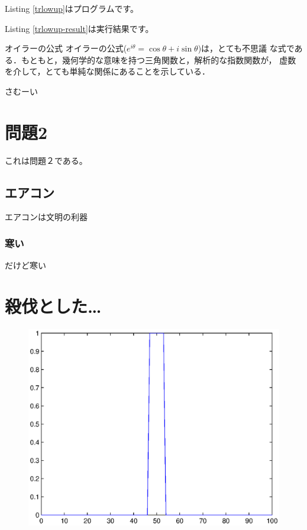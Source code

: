 \documentclass[10pt]{jarticle}
\begin{document}
Listing \ref{trlowup}はプログラムです。

Listing \ref{trlowup-result}は実行結果です。

\begin{itembox}[l]{オイラーの公式}
  オイラーの公式($e^{i\theta}=\cos\theta+i\sin\theta$)は，とても不思議
  な式である．もともと，幾何学的な意味を持つ三角関数と，解析的な指数関数が，
  虚数を介して，とても単純な関係にあることを示している．
\end{itembox}

\begin{boxnote}
  さむーい
\end{boxnote}

\newpage
\section{問題2}
これは問題２である。
\subsection{エアコン}
エアコンは文明の利器
\subsubsection{寒い}
だけど寒い

\newpage
\section{殺伐とした…}
\begin{figure}[h]
  \begin{center}
    \includegraphics[width=13cm]{pic/problem4.eps}
  \end{center}
\end{figure}
\end{document}
